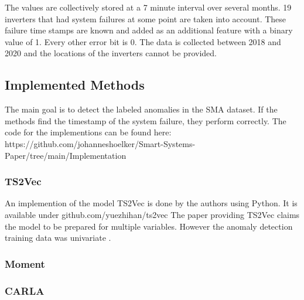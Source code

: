 The values are collectively stored at a 7 minute interval over several months. 19 inverters that had system failures at some point are taken into account. These failure time stamps are known and added as an additional feature with a binary value of 1. Every other error bit is 0. The data is collected between 2018 and 2020 and the locations of the inverters cannot be provided.


\subsection{Implemented Methods}
The main goal is to detect the labeled anomalies in the SMA dataset. If the methods find the timestamp of the system failure, they perform correctly. 
The code for the implementions can be found here: https://github.com/johanneshoelker/Smart-Systems-Paper/tree/main/Implementation


%

\subsubsection{TS2Vec}
An implemention of the model TS2Vec is done by the authors using Python. It is available under github.com/yuezhihan/ts2vec
The paper providing TS2Vec claims the model to be prepared for multiple variables. However the anomaly detection training data was univariate .

\subsubsection{Moment}

\subsubsection{CARLA}

